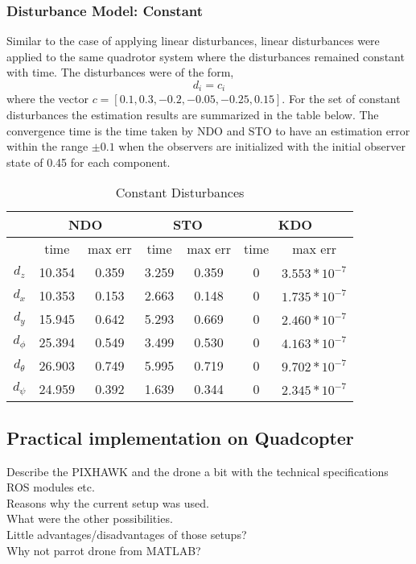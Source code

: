 \documentclass{article}
\begin{document}
\subsubsection{Disturbance Model: Constant}
Similar to the case of applying linear disturbances, linear disturbances were applied to the same quadrotor system where the disturbances remained constant with time. The disturbances were of the form, 
\begin{equation}
d_i = c_i
\end{equation}
where the vector $c=[0.1,0.3,-0.2,-0.05,-0.25,0.15]$. 
For the set of constant disturbances the estimation results are summarized in the table below. The convergence time is the time taken by NDO and STO to have an estimation error within the range $\pm0.1$ when the observers are initialized with the initial observer state of 0.45 for each component.
\begin{table}[!htbp]
\centering
\caption{Constant Disturbances}
\begin{tabular}{*7c}
\toprule
{}  &  \multicolumn{2}{c}{NDO} & \multicolumn{2}{c}{STO} & \multicolumn{2}{c}{KDO}\\
\midrule
{}        &   time   & max err  & time  & max err& time  & max err\\
$d_z$     &  10.354 & 0.359   & 3.259  & 0.359 & 0     & $3.553*10^{-7}$\\
$d_x$     &  10.353 & 0.153   & 2.663  & 0.148 & 0     & $1.735*10^{-7}$\\
$d_y$     &  15.945 & 0.642   & 5.293  & 0.669 & 0     & $2.460*10^{-7}$\\
$d_\phi$  &  25.394 & 0.549   & 3.499  & 0.530 & 0     & $4.163*10^{-7}$\\
$d_\theta$&  26.903 & 0.749   & 5.995  & 0.719 & 0     & $9.702*10^{-7}$\\
$d_\psi$  &  24.959 & 0.392   & 1.639  & 0.344 & 0     & $2.345*10^{-7}$\\
\bottomrule
\end{tabular}
\end{table}


\subsection{Practical implementation on Quadcopter}
Describe the PIXHAWK and the drone a bit with the technical specifications\\ROS modules etc.\\Reasons why the current setup was used.\\What were the other possibilities.\\Little advantages/disadvantages of those setups?\\Why not parrot drone from MATLAB? 
\end{document}
